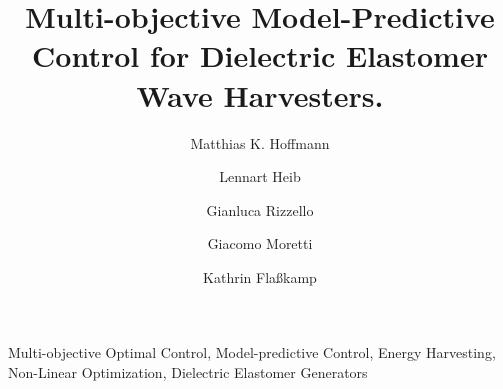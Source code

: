 \documentclass[algo2e]{ifacconf}
\begin{document}
	\begin{frontmatter}
		
		\title{Multi-objective Model-Predictive Control for Dielectric Elastomer Wave Harvesters.} 
		
		\author[First]{Matthias K. Hoffmann} 
		\author[First]{Lennart Heib} 
		\author[Second]{Gianluca Rizzello}
		\author[Third]{Giacomo Moretti}
		\author[First]{Kathrin Flaßkamp} 
		
		\address[First]{Systems Modelling and Simulation,\linebreak (e-mail:~\{{matthias.hoffmann, kathrin.flasskamp\}@uni-saarland.de, lennartheib@gmail.com})}
		\address[Second]{Adaptive Polymer Systems,\linebreak	(e-mail:~gianluca.rizzello@imsl.uni-saarland.de)}
		\address[Third]{Università degli Studi di Trento, (e-mail:~giacomo.moretti@unitn.it)
			\linebreak
			$^{*}$ and $^{**}$ from Saarland University, Saarbrücken, Germany.}
		
		\begin{abstract}                %
			
		\end{abstract}
		
		\begin{keyword}
			Multi-objective Optimal Control, Model-predictive Control, Energy Harvesting, Non-Linear Optimization, Dielectric Elastomer Generators
		\end{keyword}
		
	\end{frontmatter}
	
	
	
	
	
	
	
	
	
\end{document}
